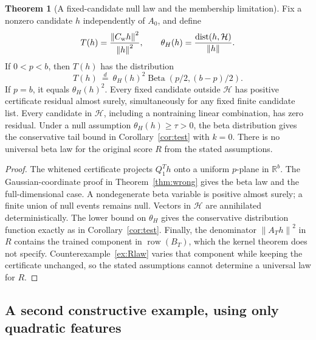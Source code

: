 \documentclass[11pt,a4paper]{article}
\theoremstyle{definition}
\newtheorem{theorem}{Theorem}[section]
\theoremstyle{definition}
\theoremstyle{remark}\newtheorem{remark}[theorem]{Remark}
\newcommand{\R}{\mathbb R}\newcommand{\Prob}{\mathbb P}\newcommand{\E}{\mathbb E}
\newcommand{\HH}{\mathcal H}\newcommand{\XX}{\mathcal X}\newcommand{\col}{\operatorname{col}}
\newcommand{\row}{\operatorname{row}}\newcommand{\rank}{\operatorname{rank}}
\newcommand{\norm}[1]{\left\lVert #1\right\rVert}
\begin{document}
\begin{theorem}[A fixed-candidate null law and the membership limitation]\label{thm:membership}
Fix a nonzero candidate $h$ independently of $A_0$, and define
\[
T(h)=\frac{\norm{C_{\rm w}h}^2}{\norm h^2},\qquad
\theta_H(h)=\frac{\dist(h,\HH)}{\norm h}.
\]
If $0<p<b$, then $T(h)$ has the distribution
\[
T(h)\ \stackrel d=\ \theta_H(h)^2\operatorname{Beta}(p/2,(b-p)/2).
\]
If $p=b$, it equals $\theta_H(h)^2$. Every fixed candidate outside $\HH$ has positive certificate residual almost surely, simultaneously for any fixed finite candidate list. Every candidate in $\HH$, including a nontraining linear combination, has zero residual. Under a null assumption $\theta_H(h)\ge\tau>0$, the beta distribution gives the conservative tail bound in Corollary~\ref{cor:test} with $k=0$. There is no universal beta law for the original score $R$ from the stated assumptions.
\end{theorem}
\begin{proof}
The whitened certificate projects $Q_1^Th$ onto a uniform $p$-plane in $\R^b$. The Gaussian-coordinate proof in Theorem~\ref{thm:wrong} gives the beta law and the full-dimensional case. A nondegenerate beta variable is positive almost surely; a finite union of null events remains null. Vectors in $\HH$ are annihilated deterministically. The lower bound on $\theta_H$ gives the conservative distribution function exactly as in Corollary~\ref{cor:test}. Finally, the denominator $\norm{A_Th}^2$ in $R$ contains the trained component in $\row(B_T)$, which the kernel theorem does not specify. Counterexample~\ref{ex:Rlaw} varies that component while keeping the certificate unchanged, so the stated assumptions cannot determine a universal law for $R$.
\end{proof}

\subsection{A second constructive example, using only quadratic features}
\end{document}

